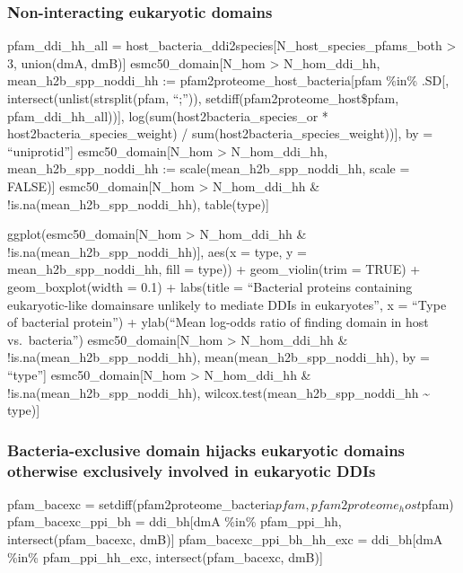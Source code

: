 \documentclass[
]{article}
\begin{document}
\hypertarget{non-interacting-eukaryotic-domains}{%
\subsubsection{Non-interacting eukaryotic
domains}\label{non-interacting-eukaryotic-domains}}

pfam\_ddi\_hh\_all =
host\_bacteria\_ddi2species{[}N\_host\_species\_pfams\_both
\textgreater{} 3, union(dmA, dmB){]} esmc50\_domain{[}N\_hom
\textgreater{} N\_hom\_ddi\_hh, mean\_h2b\_spp\_noddi\_hh :=
pfam2proteome\_host\_bacteria{[}pfam \%in\% .SD{[},
intersect(unlist(strsplit(pfam, ``;'')),
setdiff(pfam2proteome\_host\$pfam, pfam\_ddi\_hh\_all)){]},
log(sum(host2bacteria\_species\_or * host2bacteria\_species\_weight) /
sum(host2bacteria\_species\_weight)){]}, by = ``uniprotid''{]}
esmc50\_domain{[}N\_hom \textgreater{} N\_hom\_ddi\_hh,
mean\_h2b\_spp\_noddi\_hh := scale(mean\_h2b\_spp\_noddi\_hh, scale =
FALSE){]} esmc50\_domain{[}N\_hom \textgreater{} N\_hom\_ddi\_hh \&
!is.na(mean\_h2b\_spp\_noddi\_hh), table(type){]}

ggplot(esmc50\_domain{[}N\_hom \textgreater{} N\_hom\_ddi\_hh \&
!is.na(mean\_h2b\_spp\_noddi\_hh){]}, aes(x = type, y =
mean\_h2b\_spp\_noddi\_hh, fill = type)) + geom\_violin(trim = TRUE) +
geom\_boxplot(width = 0.1) + labs(title = ``Bacterial proteins
containing eukaryotic-like domains\nthat are unlikely to mediate DDIs in
eukaryotes'', x = ``Type of bacterial protein'') + ylab(``Mean log-odds
ratio of finding domain in host vs.~bacteria'') esmc50\_domain{[}N\_hom
\textgreater{} N\_hom\_ddi\_hh \& !is.na(mean\_h2b\_spp\_noddi\_hh),
mean(mean\_h2b\_spp\_noddi\_hh), by = ``type''{]}
esmc50\_domain{[}N\_hom \textgreater{} N\_hom\_ddi\_hh \&
!is.na(mean\_h2b\_spp\_noddi\_hh), wilcox.test(mean\_h2b\_spp\_noddi\_hh
\textasciitilde{} type){]}

\hypertarget{bacteria-exclusive-domain-hijacks-eukaryotic-domains-otherwise-exclusively-involved-in-eukaryotic-ddis}{%
\subsubsection{Bacteria-exclusive domain hijacks eukaryotic domains
otherwise exclusively involved in eukaryotic
DDIs}\label{bacteria-exclusive-domain-hijacks-eukaryotic-domains-otherwise-exclusively-involved-in-eukaryotic-ddis}}

pfam\_bacexc =
setdiff(pfam2proteome\_bacteria\(pfam, pfam2proteome_host\)pfam)
pfam\_bacexc\_ppi\_bh = ddi\_bh{[}dmA \%in\% pfam\_ppi\_hh,
intersect(pfam\_bacexc, dmB){]} pfam\_bacexc\_ppi\_bh\_hh\_exc =
ddi\_bh{[}dmA \%in\% pfam\_ppi\_hh\_exc, intersect(pfam\_bacexc, dmB){]}
\end{document}
